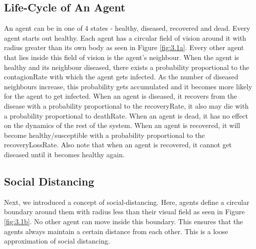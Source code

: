 \documentclass[a4paper,11pt]{article}
\begin{document}
    \subsection{Life-Cycle of An Agent}\label{subsec:life-cycle-of-an-agent}
    An agent can be in one of 4 states - healthy, diseased, recovered and dead.
    Every agent starts out healthy.
    Each agent has a circular field of vision around it with radius greater than its own body as seen in Figure \ref{fig:3.1a}.
    Every other agent that lies inside this field of vision is the agent's neighbour.
    When the agent is healthy and its neighbour diseased, there exists a probability proportional to the contagionRate with which the agent gets infected.
    As the number of diseased neighbours increase, this probability gets accumulated and it becomes more likely for the agent to get infected.
    When an agent is diseased, it recovers from the disease with a probability proportional to the recoveryRate, it also may die with a probability proportional to deathRate.
    When an agent is dead, it has no effect on the dynamics of the rest of the system.
    When an agent is recovered, it will become healthy/susceptible with a probability proportional to the recoveryLossRate.
    Also note that when an agent is recovered, it cannot get diseased until it becomes healthy again.

    \subsection{Social Distancing}\label{subsec:social-distancing}
    Next, we introduced a concept of social-distancing\cite{3b1b}.
    Here, agents define a circular boundary around them with radius less than their visual field as seen in Figure \ref{fig:3.1b}.
    No other agent can move inside this boundary.
    This ensures that the agents always maintain a certain distance from each other.
    This is a loose approximation of social distancing.
\end{document}
